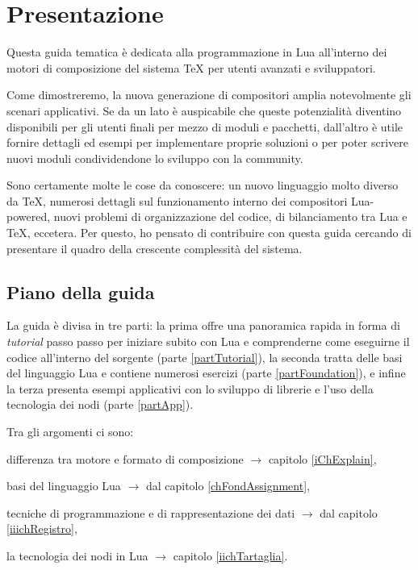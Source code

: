 

\chapter{Presentazione}

Questa guida tematica è dedicata alla programmazione in Lua all'interno dei
motori di composizione del sistema \TeX{} per utenti avanzati e sviluppatori.

Come dimostreremo, la nuova generazione di compositori amplia notevolmente gli
scenari applicativi. Se da un lato è auspicabile che queste potenzialità
diventino disponibili per gli utenti finali per mezzo di moduli e pacchetti,
dall'altro è utile fornire dettagli ed esempi per implementare proprie soluzioni
o per poter scrivere nuovi moduli condividendone lo sviluppo con la community.

Sono certamente molte le cose da conoscere: un nuovo linguaggio molto diverso da
\TeX{}, numerosi dettagli sul funzionamento interno dei compositori Lua-powered,
nuovi problemi di organizzazione del codice, di bilanciamento tra Lua e \TeX,
eccetera. Per questo, ho pensato di contribuire con questa guida cercando di
presentare il quadro della crescente complessità del sistema.


\section{Piano della guida}

La guida è divisa in tre parti: la prima offre una panoramica rapida in forma di
\emph{tutorial} passo passo per iniziare subito con Lua e comprenderne come
eseguirne il codice all'interno del sorgente (parte \ref{partTutorial}), la
seconda tratta delle basi del linguaggio Lua e contiene numerosi esercizi (parte
\ref{partFoundation}), e infine la terza presenta esempi applicativi con lo
sviluppo di librerie e l'uso della tecnologia dei nodi (parte \ref{partApp}).

Tra gli argomenti ci sono:
\begin{compactitemize}
\item differenza tra motore e formato di composizione \( \to \) capitolo
\ref{iChExplain},
\item basi del linguaggio Lua \( \to \) dal capitolo \ref{chFondAssignment},
\item tecniche di programmazione e di rappresentazione dei dati \( \to \) dal
capitolo \ref{iiichRegistro},
\item la tecnologia dei nodi in Lua \( \to \) capitolo \ref{iichTartaglia}.
\end{compactitemize}


